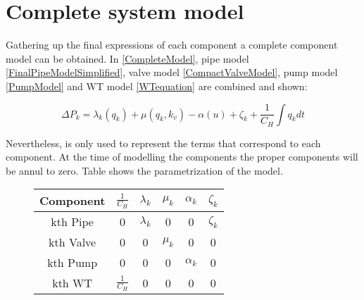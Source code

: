 \section{Complete system model} 
\label{CompleteSystemModel}

Gathering up the final expressions of each component a complete component model can be obtained. In \eqref{CompleteModel}, pipe model \eqref{FinalPipeModelSimplified}, valve model 
\eqref{CompactValveModel}, pump model \eqref{PumpModel} and WT model \eqref{WTequation} are combined and shown:

\begin{equation}
  \label{CompleteModel}
  \Delta P_k = \lambda_k (q_k) + \mu (q_k,k_v) - \alpha (u) + \zeta_k + \frac{1}{C_H}  \int   q_k dt 
\end{equation}

Nevertheless,  is only used to represent the terms that correspond to each component. At the time of modelling the components
the proper components will be annul to zero. Table shows the 
parametrization of the model.

\begin{figure}[H]
	\centering
\begin{tabular}{c|ccccc} 
  			\bfseries Component    &   $\frac{1}{C_H}$    &    \bfseries $\lambda_k$    &    \bfseries $\mu_k$    &    \bfseries $\alpha_k$    &    \bfseries $\zeta_k$  					\\ 
  			\hline
			kth Pipe		  	      &      0                    &         $\lambda_k$                            &    0                             &            0                       &      $\zeta_k$   		                         \\ 
			kth Valve           	      &      0                    &         0                            &    $\mu_k$                             &            0                       &      0    					 \\ 
			kth Pump 		      &      0                    &         0                            &    0                             &            $\alpha_k$                       &      0    				         \\ 
			kth WT                           &      $\frac{1}{C_H}$                   &         0                            &    0                             &            0                       &      0      
			
\end{tabular}
\end{figure}	

